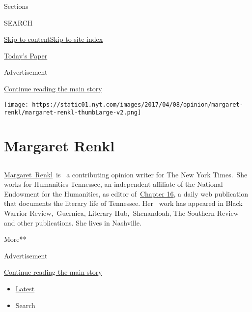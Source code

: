 Sections

SEARCH

\protect\hyperlink{site-content}{Skip to
content}\protect\hyperlink{site-index}{Skip to site index}

\href{https://myaccount.nytimes.com/auth/login?response_type=cookie\&client_id=vi}{}

\href{https://www.nytimes.com/section/todayspaper}{Today's Paper}

Advertisement

\protect\hyperlink{after-top}{Continue reading the main story}

\texttt{[image: https://static01.nyt.com/images/2017/04/08/opinion/margaret-renkl/margaret-renkl-thumbLarge-v2.png]}

\hypertarget{margaret-renkl}{%
\section{Margaret Renkl}\label{margaret-renkl}}

\subsection{}

\href{http://margaretrenkl.com/}{Margaret~Renkl}~is~ a contributing
opinion writer for The New York Times.~She works for Humanities
Tennessee, an independent affiliate of the National Endowment for the
Humanities, as editor of~\href{http://chapter16.org/}{Chapter 16}, a
daily web publication that documents the literary life of Tennessee.
Her~ work has appeared in Black Warrior Review,~Guernica, Literary
Hub,~Shenandoah, The Southern Review and other publications. She lives
in Nashville.

More**

Advertisement

\protect\hyperlink{after-mid1}{Continue reading the main story}

\begin{itemize}
\tightlist
\item
  \protect\hyperlink{stream-panel}{Latest}
\item
  Search
\end{itemize}

